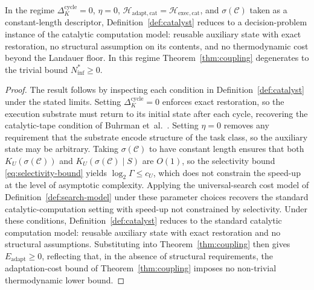 \documentclass[runningheads]{llncs}
\newcommand{\Hw}{\mathcal{H}}
\newcommand{\Class}{\mathcal{C}}
\newcommand{\Eadapt}{E_{\mathrm{adapt}}}
\begin{document}
\begin{proposition}
\label{prop:cc-limit}
In the regime $\Delta_K^{\mathrm{cycle}}=0$, $\eta=0$,
$\Hw_{\mathrm{adapt,cat}}=\Hw_{\mathrm{exec,cat}}$, and
$\sigma(\Class)$ taken as a constant-length descriptor,
Definition~\ref{def:catalyst} reduces to a decision-problem instance
of the catalytic computation model: reusable auxiliary state with
exact restoration, no structural assumption on its contents, and
no thermodynamic cost beyond the Landauer floor. In this regime
Theorem~\ref{thm:coupling} degenerates to the trivial bound
$N_{\mathrm{inf}}^{*}\ge 0$.
\end{proposition}
\begin{proof}
The result follows by inspecting each condition in
Definition~\ref{def:catalyst} under the stated limits. Setting
$\Delta_K^{\mathrm{cycle}}=0$ enforces exact restoration, so the
execution substrate must return to its initial state after each
cycle, recovering the catalytic-tape condition of Buhrman
et~al.~\cite{buhrman2014computing}. Setting $\eta=0$ removes any
requirement that the substrate encode structure of the task class,
so the auxiliary state may be arbitrary. Taking
$\sigma(\Class)$ to have constant length ensures that both
$K_U(\sigma(\Class))$ and $K_U(\sigma(\Class)\mid S)$ are $O(1)$,
so the selectivity bound \eqref{eq:selectivity-bound} yields
$\log_2\Gamma\le c_U$, which does not constrain the speed-up at the
level of asymptotic complexity. Applying the universal-search cost
model of Definition~\ref{def:search-model} under these parameter
choices recovers the standard catalytic-computation setting with
speed-up not constrained by selectivity. Under these conditions, Definition~\ref{def:catalyst} reduces to
the standard catalytic computation model: reusable auxiliary state
with exact restoration and no structural assumptions. Substituting
into Theorem~\ref{thm:coupling} then gives $\Eadapt\ge 0$,
reflecting that, in the absence of structural requirements, the
adaptation-cost bound of Theorem~\ref{thm:coupling} imposes no
non-trivial thermodynamic lower bound.
\end{proof}
\end{document}
